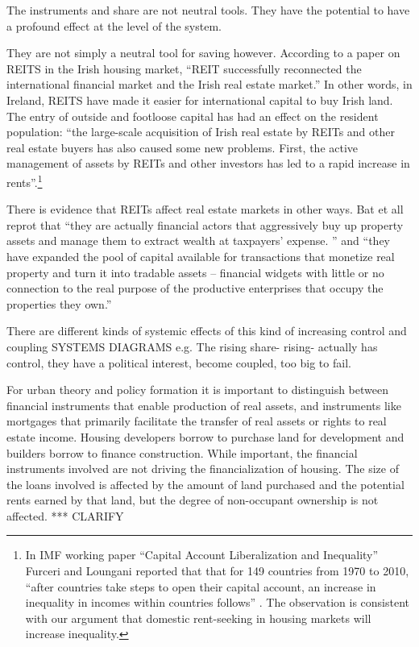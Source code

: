 The instruments and share are not neutral tools. They have the potential to have a profound effect at the level of the system.

They are not simply a neutral tool for saving however. According to a paper \cite{wangAnalyzeImpactREITs2021} on REITS in the Irish housing market, ``REIT successfully reconnected the international financial market and the Irish real estate market.'' In other words, in Ireland, REITS have made it easier for international capital to buy Irish land. The entry of outside and footloose capital has had an effect on the resident population:  ``the large-scale acquisition of Irish real estate by REITs and other real estate buyers has also caused some new problems. First, the active management of assets by REITs and other investors has led to a rapid increase in rents''.\footnote{In  IMF working paper ``Capital Account Liberalization and Inequality'' \cite{furceriCapitalAccountLiberalization2015}  Furceri and Loungani reported that that for 149 countries from 1970 to 2010, ``after countries take steps to open their capital account, an increase in inequality in incomes within countries follows'' . The observation is consistent with our argument  that domestic rent-seeking in housing markets will increase inequality.}   

There is evidence that REITs affect real estate markets in other ways. Bat et all  \cite{batRolePublicREITs2022} reprot that  ``they are actually financial actors that aggressively buy up property assets and manage them to extract wealth at taxpayers’ expense. '' and ``they have expanded the pool of capital available for transactions that monetize real property and turn it into tradable assets – financial widgets with little or no connection to the real purpose of the productive enterprises that occupy the properties they own.''




There are different kinds of systemic effects of this kind of increasing control and coupling 
SYSTEMS DIAGRAMS
e.g.
The rising share- 
rising- actually has control, they have a political interest, become coupled, too big to fail.


For urban theory and policy formation it is important to distinguish between financial instruments that enable production of real assets, and instruments like  mortgages that primarily facilitate the transfer of real assets or rights to real estate  income. Housing developers borrow to purchase land for development and builders borrow to finance construction. While important, the financial instruments involved are not driving the financialization of housing.  The size of the loans involved is affected by the amount of land purchased and the potential rents earned by that land, but the degree of non-occupant ownership is not affected. *** CLARIFY



